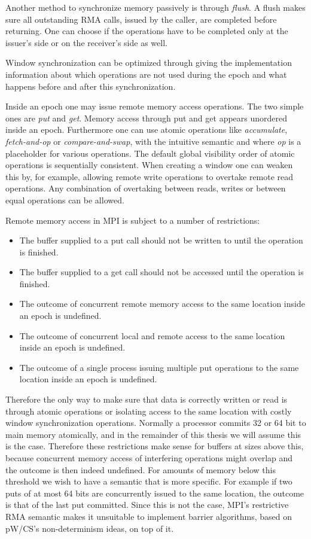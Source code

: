 \documentclass[a4paper, 10pt]{article}
\begin{document}
Another method to synchronize memory passively is through \emph{flush}. A flush makes sure all outstanding RMA calls, issued by the caller, are completed before returning. One can choose if the operations have to be completed only at the issuer's side or on the receiver's side as well.

Window synchronization can be optimized through giving the implementation information about which operations are not used during the epoch and what happens before and after this synchronization.

Inside an epoch one may issue remote memory access operations. The two simple ones are \emph{put} and \emph{get}. Memory access through put and get appears unordered inside an epoch.
Furthermore one can use atomic operations like \emph{accumulate}, \emph{fetch-and-op} or \emph{compare-and-swap}, with the intuitive semantic and where \emph{op} is a placeholder for various operations. The default global visibility order of atomic operations is sequentially consistent. When creating a window one can weaken this by, for example, allowing remote write operations to overtake remote read operations. Any combination of overtaking between reads, writes or between equal operations can be allowed.

Remote memory access in MPI is subject to a number of restrictions:
\begin{itemize}
	\item The buffer supplied to a put call should not be written to until the operation is finished.
	\item The buffer supplied to a get call should not be accessed until the operation is finished.
	\item The outcome of concurrent remote memory access to the same location inside an epoch is undefined.
	\item The outcome of concurrent local and remote access to the same location inside an epoch is undefined.
	\item The outcome of a single process issuing multiple put operations to the same location inside an epoch is undefined.
\end{itemize}
Therefore the only way to make sure that data is correctly written or read is through atomic operations or isolating access to the same location with costly window synchronization operations.
Normally a processor commits 32 or 64 bit to main memory atomically, and in the remainder of this thesis we will assume this is the case.
Therefore these restrictions make sense for buffers at sizes above this, because concurrent memory access of interfering operations might overlap and the outcome is then indeed undefined.
For amounts of memory below this threshold we wish to have a semantic that is more specific. For example if two puts of at most 64 bits are concurrently issued to the same location, the outcome is that of the last put committed. Since this is not the case, MPI's restrictive RMA semantic makes it unsuitable to implement barrier algorithms, based on pW/CS's non-determinism ideas, on top of it.
\end{document}
